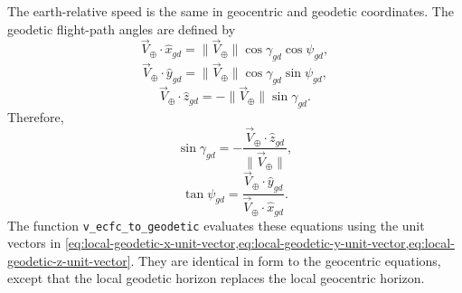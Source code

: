 The earth-relative speed is the same in geocentric and geodetic coordinates. The
geodetic flight-path angles are defined by
\begin{equation}
  \vec{V}_{\oplus}\cdot\hat{x}_{gd}
    =\lVert\vec{V}_{\oplus}\rVert
      \cos\gamma_{gd}\cos\psi_{gd},
  \label{eq:geodetic-velocity-x}
\end{equation}
\begin{equation}
  \vec{V}_{\oplus}\cdot\hat{y}_{gd}
    =\lVert\vec{V}_{\oplus}\rVert
      \cos\gamma_{gd}\sin\psi_{gd},
  \label{eq:geodetic-velocity-y}
\end{equation}
\begin{equation}
  \vec{V}_{\oplus}\cdot\hat{z}_{gd}
    =-\lVert\vec{V}_{\oplus}\rVert\sin\gamma_{gd}.
  \label{eq:geodetic-velocity-z}
\end{equation}
Therefore,
\begin{equation}
  \sin\gamma_{gd}
    =-\frac{\vec{V}_{\oplus}\cdot\hat{z}_{gd}}
            {\lVert\vec{V}_{\oplus}\rVert},
  \label{eq:geodetic-gamma-from-ecfc}
\end{equation}
\begin{equation}
  \tan\psi_{gd}
    =\frac{\vec{V}_{\oplus}\cdot\hat{y}_{gd}}
           {\vec{V}_{\oplus}\cdot\hat{x}_{gd}}.
  \label{eq:geodetic-psi-from-ecfc}
\end{equation}
The function \texttt{v\_ecfc\_to\_geodetic} evaluates these equations using the
unit vectors in
\cref{eq:local-geodetic-x-unit-vector,eq:local-geodetic-y-unit-vector,eq:local-geodetic-z-unit-vector}.
They are identical in form to the geocentric equations, except that the local geodetic
horizon replaces the local geocentric horizon.

